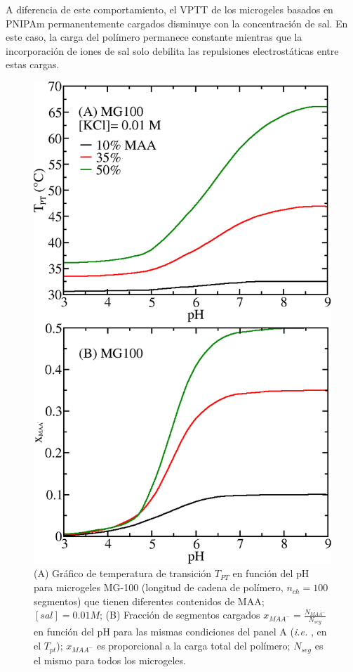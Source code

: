 A diferencia de este comportamiento, el VPTT de los microgeles basados en PNIPAm permanentemente cargados disminuye con la concentraci\'on de sal\addcite[Lopez2020].
En este caso, la carga del pol\'imero permanece constante mientras que la incorporaci\'on de iones de sal solo debilita las repulsiones electrost\'aticas entre estas cargas.





\begin{figure}[!tb]
	\centering
	\includegraphics[width=0.5\linewidth]{Figures/graph-gel/Tpt-pH_MAA.png}
	\caption{(A) Gr\'afico de temperatura de transici\'on $T_{PT}$ en funci\'on del pH para microgeles MG-100 (longitud de cadena de pol\'imero, $n_{ch}=100$ segmentos) que tienen diferentes contenidos de MAA; $[sal]=0.01 M$;
	(B) Fracci\'on de segmentos cargados $x_{MAA^-}=\frac{N_{MAA^-}}{N_{seg}}$ en funci\'on del pH para las mismas condiciones del panel A (\emph{i.e.} , en el $T_{pt}$); $x_{MAA^-}$ es proporcional a la carga total del pol\'imero; $N_{seg}$ es el mismo para todos los microgeles.}
	\label{fig:Tpt_MAA}
\end{figure}


